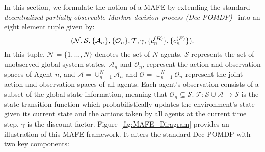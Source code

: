 \label{sec::fair_dec_pomp}

In this section, we formulate the notion of a MAFE by extending the standard \textit{decentralized partially observable Markov decision process (Dec-POMDP)}~\cite{gronauer2022multi} into an eight element tuple given by:  
\begin{equation}
    (\mathcal{N},\mathcal{S},\{\mathcal{A}_n\},\{\mathcal{O}_n\},\mathcal{T}, \gamma, \{c_n^{(R)}\},\{c_n^{(F)}\}).\notag
\end{equation}
In this tuple, $\mathcal{N}= \{1,...,N\}$ denotes the set of $N$ agents. $\mathcal{S}$ represents the set of unobserved global system states. $\mathcal{A}_n$ and $\mathcal{O}_n$, represent the action and observation spaces of Agent $n$, and $\boldsymbol{\mathcal{A}}=\cup_{n=1}^N\mathcal{A}_n$ and $\boldsymbol{\mathcal{O}}=\cup_{n=1}^N\mathcal{O}_n$ represent the joint action and observation spaces of all agents. Each agent's observation consists of a subset of the global state information, meaning that $\mathcal{O}_n \subseteq \mathcal{S}$.  $\mathcal{T}:\mathcal{S}\cup\boldsymbol{\mathcal{A}}\rightarrow \mathcal{S}$ is the state transition function which probabilistically updates the environment's state given its current state and the actions taken by all agents at the current time step. $\gamma$ is the discount factor. Figure~\ref{fig:MAFE_Diragram} provides an illustration of this MAFE framework. It alters the standard Dec-POMDP with two key components:

